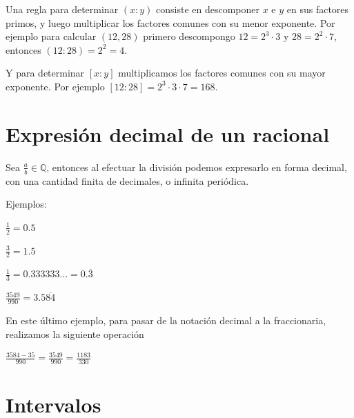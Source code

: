 \begin{observation}
Una regla para determinar $(x:y)$ consiste en descomponer $x$ e $y$ en sus factores primos, y luego multiplicar los factores comunes con su menor exponente.  Por ejemplo para calcular $(12,28)$ primero descompongo $12 = 2^3 \cdot 3$ y $28 = 2^2 \cdot 7$, entonces $(12:28) = 2^2 = 4$.
	
Y para determinar $[x:y]$ multiplicamos los factores comunes con su mayor exponente.  Por ejemplo $[12:28] = 2^3 \cdot 3 \cdot 7 = 168$.	
\end{observation}

\section{Expresión decimal de un racional} 

Sea $\frac{a}{b} \in \mathbb{Q}$, entonces al efectuar la división podemos expresarlo en forma decimal, con una cantidad finita de decimales, o infinita periódica.

Ejemplos:

$\frac{1}{2} = 0.5$

$\frac{3}{2} = 1.5$

$\frac{1}{3} = 0.333333\ldots = 0.\overline{3}$

$\frac{3549}{990} = 3.5\overline{84}$

En este último ejemplo, para pasar de la notación decimal a la fraccionaria, realizamos la siguiente operación

$ \frac{3584 - 35}{990} = \frac{3549}{990} = \frac{1183}{330}$

\section{Intervalos}

